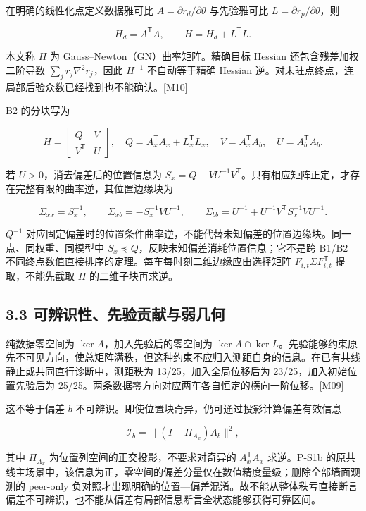 \documentclass[12pt,a4paper]{article}
\begin{document}
在明确的线性化点定义数据雅可比 \(A=\partial r_d/\partial\theta\)
与先验雅可比 \(L=\partial r_p/\partial\theta\)，则

\[H_d=A^{\mathsf T}A,\qquad H=H_d+L^{\mathsf T}L.\]

本文称 \(H\) 为 Gauss--Newton（GN）曲率矩阵。精确目标 Hessian
还包含残差加权二阶导数 \(\sum_j r_j\nabla^2r_j\)，因此 \(H^{-1}\)
不自动等于精确 Hessian
逆。对未驻点终点，连局部后验众数已经找到也不能确认。{[}M10{]}

B2 的分块写为

\[H=\begin{bmatrix}Q&V\\V^{\mathsf T}&U\end{bmatrix},\quad
Q=A_x^{\mathsf T}A_x+L_x^{\mathsf T}L_x,\quad
V=A_x^{\mathsf T}A_b,\quad U=A_b^{\mathsf T}A_b.\]

若 \(U>0\)，消去偏差后的位置信息为
\(S_x=Q-VU^{-1}V^{\mathsf T}\)。只有相应矩阵正定，才存在完整有限的曲率逆，其位置边缘块为

\[\Sigma_{xx}=S_x^{-1},\qquad
\Sigma_{xb}=-S_x^{-1}VU^{-1},\qquad
\Sigma_{bb}=U^{-1}+U^{-1}V^{\mathsf T}S_x^{-1}VU^{-1}.\]

\(Q^{-1}\)
对应固定偏差时的位置条件曲率逆，不能代替未知偏差的位置边缘块。同一点、同权重、同模型中
\(S_x\preceq Q\)，反映未知偏差消耗位置信息；它不是跨 B1/B2
不同终点数值直接排序的定理。每车每时刻二维边缘应由选择矩阵
\(F_{i,t}\Sigma F_{i,t}^{\mathsf T}\) 提取，不能先截取 \(H\)
的二维子块再求逆。

\subsection{3.3
可辨识性、先验贡献与弱几何}\label{ux53efux8fa8ux8bc6ux6027ux5148ux9a8cux8d21ux732eux4e0eux5f31ux51e0ux4f55}

纯数据零空间为 \(\ker A\)，加入先验后的零空间为
\(\ker A\cap\ker L\)。先验能够约束原先不可见方向，使总矩阵满秩，但这种约束不应归入测距自身的信息。在已有共线静止或共同直行诊断中，测距秩为
13/25，加入全局位移后为 23/25，加入初始位置先验后为
25/25。两条数据零方向对应两车各自恒定的横向一阶位移。{[}M09{]}

这不等于偏差 \(b\)
不可辨识。即使位置块奇异，仍可通过投影计算偏差有效信息

\[\mathcal I_b=\|(I-\Pi_{A_x})A_b\|^2,\]

其中 \(\Pi_{A_x}\) 为位置列空间的正交投影，不要求对奇异的
\(A_x^{\mathsf T}A_x\) 求逆。P-S1b
的原共线主场景中，该信息为正，零空间的偏差分量仅在数值精度量级；删除全部墙面观测的
peer-only
负对照才出现明确的位置---偏差混淆。故不能从整体秩亏直接断言偏差不可辨识，也不能从偏差有局部信息断言全状态能够获得可靠区间。
\end{document}

